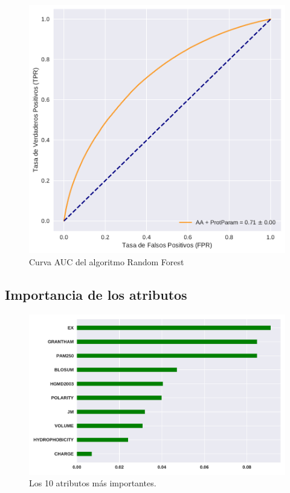 \begin{figure}[H]
    \centering
    \includegraphics[scale=0.5]{documents/latex/figures/3/auc_1.pdf}
    \caption{Curva AUC del algoritmo Random Forest}
    \label{fig:auc_1}
\end{figure}


\subsection{Importancia de los atributos}

\begin{figure}[H]
    \centering
    \includegraphics[scale=0.73]{documents/latex/figures/3/importance_1.pdf}
    \caption{Los 10 atributos más importantes.}
    \label{fig:importance_1}
\end{figure}


